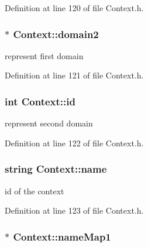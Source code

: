 Definition at line 120 of file Context.h.

\hypertarget{class_context_a2e9112268666d45cfb4139d01e7d7019}{
\subsubsection[{domain2}]{$\ast$ {\bf Context::domain2}}}
\label{class_context_a2e9112268666d45cfb4139d01e7d7019}


represent first domain 



Definition at line 121 of file Context.h.

\hypertarget{class_context_a134a1f80c8256db2afdb6d6f3096e0d6}{
\subsubsection[{id}]{\setlength{\rightskip}{0pt plus 5cm}int {\bf Context::id}}}
\label{class_context_a134a1f80c8256db2afdb6d6f3096e0d6}


represent second domain 



Definition at line 122 of file Context.h.

\hypertarget{class_context_af22c18b4ad495688a68ad4d410009100}{
\subsubsection[{name}]{\setlength{\rightskip}{0pt plus 5cm}string {\bf Context::name}}}
\label{class_context_af22c18b4ad495688a68ad4d410009100}


id of the context 



Definition at line 123 of file Context.h.

\hypertarget{class_context_a092b46cd54293fd8b18c514fb61c04de}{
\subsubsection[{nameMap1}]{$\ast$ {\bf Context::nameMap1}}}
\label{class_context_a092b46cd54293fd8b18c514fb61c04de}


